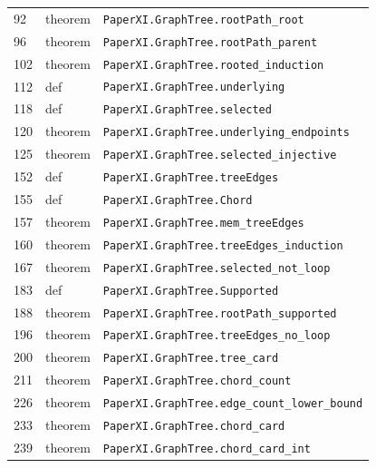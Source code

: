 \documentclass[10pt,oneside]{book}
\begin{document}
\begin{longtable}{@{}p{}p{}p{}@{}}
92&theorem&\nolinkurl{PaperXI.GraphTree.rootPath_root}\\

96&theorem&\nolinkurl{PaperXI.GraphTree.rootPath_parent}\\

102&theorem&\nolinkurl{PaperXI.GraphTree.rooted_induction}\\

112&def&\nolinkurl{PaperXI.GraphTree.underlying}\\

118&def&\nolinkurl{PaperXI.GraphTree.selected}\\

120&theorem&\nolinkurl{PaperXI.GraphTree.underlying_endpoints}\\

125&theorem&\nolinkurl{PaperXI.GraphTree.selected_injective}\\

152&def&\nolinkurl{PaperXI.GraphTree.treeEdges}\\

155&def&\nolinkurl{PaperXI.GraphTree.Chord}\\

157&theorem&\nolinkurl{PaperXI.GraphTree.mem_treeEdges}\\

160&theorem&\nolinkurl{PaperXI.GraphTree.treeEdges_induction}\\

167&theorem&\nolinkurl{PaperXI.GraphTree.selected_not_loop}\\

183&def&\nolinkurl{PaperXI.GraphTree.Supported}\\

188&theorem&\nolinkurl{PaperXI.GraphTree.rootPath_supported}\\

196&theorem&\nolinkurl{PaperXI.GraphTree.treeEdges_no_loop}\\

200&theorem&\nolinkurl{PaperXI.GraphTree.tree_card}\\

211&theorem&\nolinkurl{PaperXI.GraphTree.chord_count}\\

226&theorem&\nolinkurl{PaperXI.GraphTree.edge_count_lower_bound}\\

233&theorem&\nolinkurl{PaperXI.GraphTree.chord_card}\\

239&theorem&\nolinkurl{PaperXI.GraphTree.chord_card_int}\\

\bottomrule\end{longtable}
\end{document}

